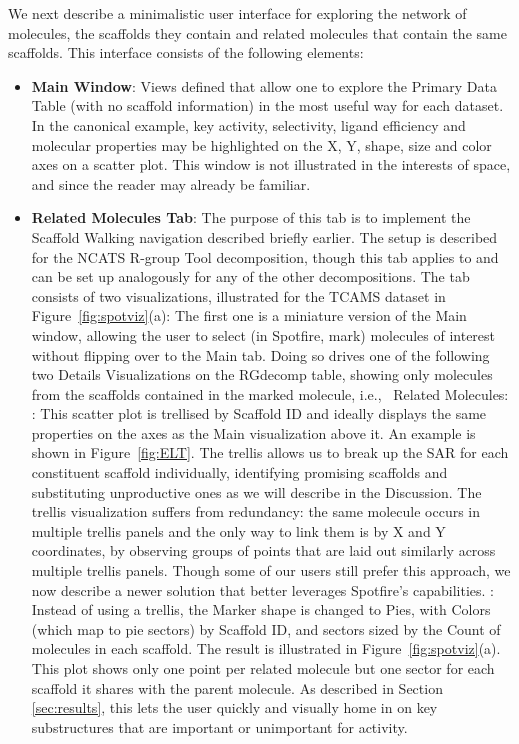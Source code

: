 \documentclass[journal=jacsat,manuscript=article]{achemso}
\newcommand*\fref[1]{Figure~\ref{fig:#1}}
\newcommand*\ie{i.e.,~}
\begin{document}
We next describe a minimalistic user interface for exploring the
network of molecules, the scaffolds they contain and related molecules
that contain the same scaffolds. This interface consists of the
following elements:
\begin{itemize}
\item {\bf Main Window}: Views defined that allow one to explore the
  Primary Data Table (with no scaffold information) in the most useful
  way for each dataset.  In the canonical example, key activity,
  selectivity, ligand efficiency and molecular properties may be
  highlighted on the X, Y, shape, size and color axes on a scatter
  plot. This window is not illustrated in the interests of space, and
  since the reader may already be familiar.
\item {\bf Related Molecules Tab}: The purpose of this tab is to
  implement the Scaffold Walking navigation described briefly earlier.
  The setup is described for the NCATS R-group Tool decomposition,
  though this tab applies to and can be set up analogously for any of
  the other decompositions. The tab consists of two visualizations,
  illustrated for the TCAMS dataset in \fref{spotviz}(a): \subitem The
  first one is a miniature version of the Main window, allowing the
  user to select (in Spotfire, mark) molecules of interest without
  flipping over to the Main tab. Doing so drives one of the following
  two Details Visualizations on the {RG}decomp table, showing only
  molecules from the scaffolds contained in the marked molecule, \ie
  Related Molecules: : This scatter
  plot is trellised by Scaffold ID and ideally displays the same
  properties on the axes as the Main visualization above it.  An
  example is shown in \fref{ELT}. The trellis allows us to break up
  the SAR for each constituent scaffold individually, identifying
  promising scaffolds and substituting unproductive ones as we will
  describe in the Discussion. The trellis visualization suffers from
  redundancy: the same molecule occurs in multiple trellis panels and
  the only way to link them is by X and Y coordinates, by observing
  groups of points that are laid out similarly across multiple trellis
  panels.  Though some of our users still prefer this approach, we now
  describe a newer solution that better leverages Spotfire's
  capabilities.  : Instead of using a
  trellis, the Marker shape is changed to Pies, with Colors (which map
  to pie sectors) by Scaffold ID, and sectors sized by the Count of
  molecules in each scaffold.  The result is illustrated in
  \fref{spotviz}(a). This plot shows only one point per related
  molecule but one sector for each scaffold it shares with the parent
  molecule.  As described in Section \ref{sec:results}, this lets the
  user quickly and visually home in on key substructures that are
  important or unimportant for activity.


\end{itemize}
\end{document}
